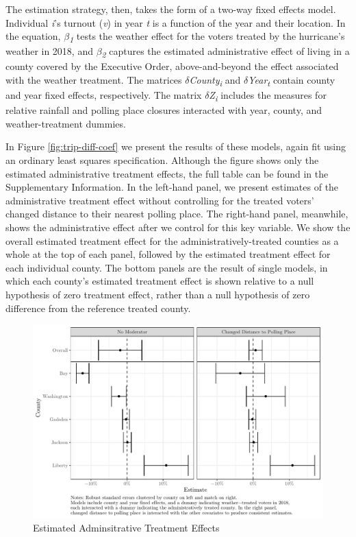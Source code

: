 \documentclass[
  12pt,
]{article}
\begin{document}
The estimation strategy, then, takes the form of a two-way fixed effects model. Individual \emph{i}'s turnout (\emph{v}) in year \emph{t} is a function of the year and their location. In the equation, \emph{\(\beta\)\textsubscript{1}} tests the weather effect for the voters treated by the hurricane's weather in 2018, and \emph{\(\beta\)\textsubscript{2}} captures the estimated administrative effect of living in a county covered by the Executive Order, above-and-beyond the effect associated with the weather treatment. The matrices \emph{\(\delta\)County\textsubscript{i}} and \emph{\(\delta\)Year\textsubscript{t}} contain county and year fixed effects, respectively. The matrix \emph{\(\delta\)Z\textsubscript{i}} includes the measures for relative rainfall and polling place closures interacted with year, county, and weather-treatment dummies.

In Figure \ref{fig:trip-diff-coef} we present the results of these models, again fit using an ordinary least squares specification. Although the figure shows only the estimated administrative treatment effects, the full table can be found in the Supplementary Information. In the left-hand panel, we present estimates of the administrative treatment effect without controlling for the treated voters' changed distance to their nearest polling place. The right-hand panel, meanwhile, shows the administrative effect after we control for this key variable. We show the overall estimated treatment effect for the administratively-treated counties as a whole at the top of each panel, followed by the estimated treatment effect for each individual county. The bottom panels are the result of single models, in which each county's estimated treatment effect is shown relative to a null hypothesis of zero treatment effect, rather than a null hypothesis of zero difference from the reference treated county.

\begin{figure}[h]

{\centering \includegraphics{hurricane_michael_files/figure-latex/tripd-to-chunk-reg-1} 

}

\caption{\label{fig:trip-diff-coef}Estimated Adminsitrative Treatment Effects}\label{fig:tripd-to-chunk-reg}
\end{figure}
\end{document}
